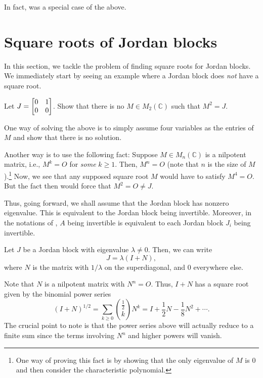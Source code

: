 \documentclass[12pt]{article}
\begin{document}
In fact,  was a special case of the above.

\section{Square roots of Jordan blocks} \label{sec:square-root-Jordan}

In this section, we tackle the problem of finding square roots for Jordan blocks. We immediately start by seeing an example where a Jordan block does \emph{not} have a square root.

\begin{exe} \label{exe:inexistence-of-square-root}
	Let $J = \begin{bmatrix} 0 & 1 \\ 0 & 0 \end{bmatrix}$. Show that there is no $M \in M_{2}(\mathbb{C})$ such that $M^{2} = J$.
\end{exe}
\begin{soln}
	One way of solving the above is to simply assume four variables as the entries of $M$ and show that there is no solution. 

	Another way is to use the following fact: Suppose $M \in M_{n}(\mathbb{C})$ is a nilpotent matrix, i.e., $M^{k} = O$ for \emph{some} $k \ge 1$. Then, $M^{n} = O$ (note that $n$ is the size of $M$).\footnote{One way of proving this fact is by showing that the only eigenvalue of $M$ is $0$ and then consider the characteristic polynomial.} \newline
	Now, we see that any supposed square root $M$ would have to satisfy $M^{4} = O$. But the fact then would force that $M^{2} = O \neq J$.
\end{soln}

Thus, going forward, we shall assume that the Jordan block has nonzero eigenvalue. This is equivalent to the Jordan block being invertible. Moreover, in the notations of , $A$ being invertible is equivalent to each Jordan block $J_{i}$ being invertible.

Let $J$ be a Jordan block with eigenvalue $\lambda \neq 0$. Then, we can write
\begin{equation*} 
	J = \lambda(I + N),
\end{equation*}
where $N$ is the matrix with $1/\lambda$ on the superdiagonal, and $0$ everywhere else.

Note that $N$ is a nilpotent matrix with $N^{n} = O$. Thus, $I + N$ has a square root given by the binomial power series
\begin{equation*} 
	(I + N)^{1/2} = \sum_{k \ge 0} \binom{\frac{1}{2}}{k} N^{k} = I + \frac{1}{2} N - \frac{1}{8} N^{2} + \cdots.
\end{equation*}
The crucial point to note is that the power series above will actually reduce to a finite sum since the terms involving $N^{n}$ and higher powers will vanish.
\end{document}
